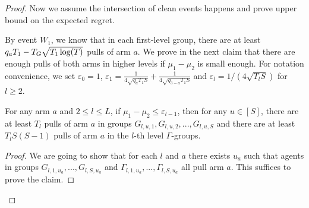 \begin{proof}
Now we assume the intersection of clean events happens and prove upper bound on the expected regret.

By event $W_1$, we know that in each first-level group, there are at least $q_a T_1- T_G \sqrt{T_1\log(T)}$ pulls of arm $a$. We prove in the next claim that there are enough pulls of both arms in higher levels if $\mu_1-\mu_2$ is small enough. For notation convenience, we set $\varepsilon_0 = 1$, $\varepsilon_1 = \frac{1}{4\sqrt{q_aT_1S}} + \frac{1}{4\sqrt{q_{3-a} T_1S}}$ and $\varepsilon_l = 1/(4\sqrt{T_lS})$ for $l \geq 2$. 

\begin{claim}
\label{clm:l2_explore}
For any arm $a$ and $2\leq l \leq L$, if $\mu_1 - \mu_2 \leq \varepsilon_{l-1}$, then for any $u \in [S]$, there are at least $T_l$ pulls of arm $a$ in groups $G_{l,u,1},G_{l,u,2}, ... ,G_{l,u,S}$ and there are at least $T_lS(S-1)$ pulls of arm $a$ in the $l$-th level $\Gamma$-groups.
\end{claim}

\begin{proof}
We are going to show that for each $l$ and $a$ there exists $u_a$ such that agents in groups $G_{l,1,u_a},...,G_{l,S,u_a}$ and $\Gamma_{l,1,u_a},...,\Gamma_{l,S,u_a}$ all pull arm $a$. This suffices to prove the claim.


\end{proof}
\end{proof}
